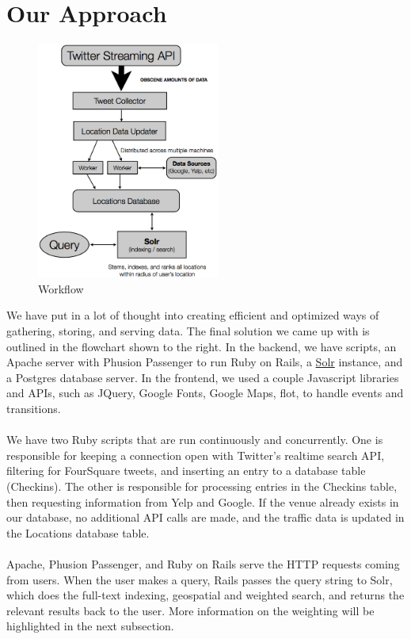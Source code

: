 \documentclass{article}
\begin{document}
\section{Our Approach}
\begin{figure}
\includegraphics[width=6cm]{flowchart.png}
\caption{Workflow}
\end{figure}
We have put in a lot of thought into creating efficient and optimized ways of gathering, storing, and serving data. The final solution
we came up with is outlined in the flowchart shown to the right. In the backend, we have scripts, an Apache server with Phusion Passenger
to run Ruby on Rails, a \href{http://lucene.apache.org/solr/}{Solr} instance, and a Postgres database server. In the frontend, we used
a couple Javascript libraries and APIs, such as JQuery, Google Fonts, Google Maps, flot, to handle events and transitions. 
\\ \\
We have two Ruby scripts that are run continuously and concurrently. One is responsible for keeping a connection open with Twitter's realtime
search API, filtering for FourSquare tweets, and inserting an entry to a database table (Checkins). The other is responsible for processing
entries in the Checkins table, then requesting information from Yelp and Google. If the venue already exists in our database, no additional
API calls are made, and the traffic data is updated in the Locations database table. 
\\ \\
Apache, Phusion Passenger, and Ruby on Rails serve the HTTP requests coming from users. When the user makes a query, Rails passes the query
string to Solr, which does the full-text indexing, geospatial and weighted search, and returns the relevant results back to the user.
More information on the weighting will be highlighted in the next subsection.
\end{document}
